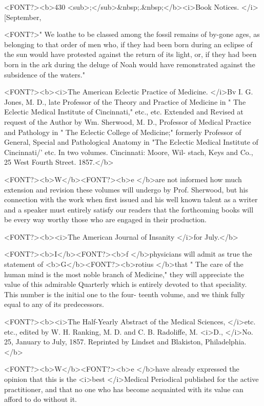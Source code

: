 <FONT?><b>430 <sub>;</sub>&nbsp;.&nbsp;</b><i>Book Notices. </i>[September,

<FONT?>" We loathe to be classed among the fossil remains of by-gone ages,
as belonging to that order of men who, if they had been born during
an eclipse of the sun would have protested against the return of its
light, or, if they had been born in the ark during the deluge of Noah
would have remonstrated against the subsidence of the waters."

<FONT?><b><i>The American Eclectic Practice of Medicine. </i>Bv I. G. Jones, M. D., late Professor of the
Theory and Practice of Medicine in " The Eclectic Medical Institute of Cincinnati,"
etc., etc. Extended and Revised at request of the Author by Wm. Sherwood, M. D.,
Professor of Medical Practice and Pathology in " The Eclectic College of Medicine;"
formerly Professor of General, Special and Pathological Anatomy in "The Eclectic
Medical Institute of Cincinnati/' etc. In two volumes. Cincinnati: Moore, Wil-
stach, Keys and Co., 25 West Fourth Street. 1857.</b>

<FONT?><b>W</b><FONT?><b>e </b>are not informed how much extension and revision these volumes
will undergo by Prof. Sherwood, but his connection with the work when
first issued and his well known talent as a writer and a speaker must
entirely satisfy our readers that the forthcoming books will be every
way worthy those who are engaged in their production.

<FONT?><b><i>The American Journal of Insanity </i>for July.</b>

<FONT?><b>I</b><FONT?><b>f </b>physicians will admit as true the statement of <b>G</b><FONT?><b>rotius </b>that " The
care of the human mind is the most noble branch of Medicine," they
will appreciate the value of this admirable Quarterly which is entirely
devoted to that speciality. This number is the initial one to the four-
teenth volume, and we think fully equal to any of its predecessors.

<FONT?><b><i>The Half-Yearly Abstract of the Medical Sciences, </i>etc. etc., edited by W. H. Ranking, M. D.
and C. B. Radoliffe, M. <i>D., </i>No. 25, January to July, 1857. Reprinted by Lindset and
Blakiston, Philadelphia.</b>

<FONT?><b>W</b><FONT?><b>e </b>have already expressed the opinion that this is the <i>best </i>Medical
Periodical published for the active practitioner, and that no one who
has become acquainted with its value can afford to do without it.

